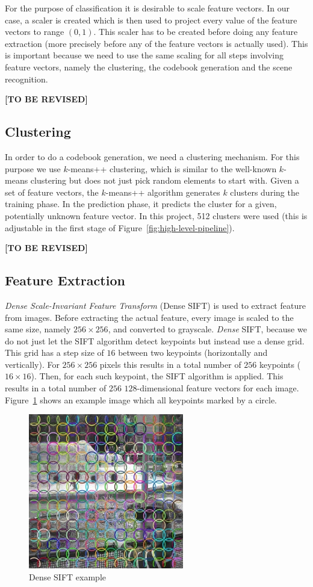 \documentclass{vldb}
\newcommand{\tbr}{{\color{red}\textbf{[TO BE REVISED]}}}
\begin{document}
For the purpose of classification it is desirable to scale feature vectors. In
our case, a scaler is created which is then used to project every value of the
feature vectors to range $(0, 1)$. This scaler has to be created before doing any
feature extraction (more precisely before any of the feature vectors is actually
used). This is important because we need to use the same scaling for all steps
involving feature vectors, namely the clustering, the codebook generation
and the scene recognition.

\tbr

\subsection{Clustering}
\label{subsec:clustering}

In order to do a codebook generation, we need a clustering mechanism. For this
purpose we use $k$-means++ clustering, which is similar to the well-known
$k$-means clustering but does not just pick random elements to start with.
Given a set of feature vectors, the $k$-means++ algorithm generates $k$ clusters
during the training phase. In the prediction phase, it predicts the cluster for
a given, potentially unknown feature vector. In this project, 512 clusters were
used (this is adjustable in the first stage of
Figure~\ref{fig:high-level-pipeline}).

\tbr

\subsection{Feature Extraction}
\label{subsec:feature-extraction}

\emph{Dense Scale-Invariant Feature Transform} (Dense SIFT) is used to extract
feature from images. Before extracting the actual feature, every image is scaled
to the same size, namely $256\times256$, and converted to grayscale.
\emph{Dense} SIFT, because we do not just let the SIFT algorithm detect keypoints
but instead use a dense grid. This grid has a step size of $16$ between two
keypoints (horizontally and vertically). For $256\times256$ pixels this results
in a total number of $256$ keypoints ($16\times16$). Then, for each such keypoint,
the SIFT algorithm is applied. This results in a total number of $256$
$128$-dimensional feature vectors for each image.
Figure~\ref{fig:dense-sift-example} shows an example image which all keypoints
marked by a circle.

\begin{figure}
  \centering
  \includegraphics[width = .25\textwidth]{figs/dense_sift.jpg}
  \caption{Dense SIFT example}
  \label{fig:dense-sift-example}
\end{figure}
\end{document}
